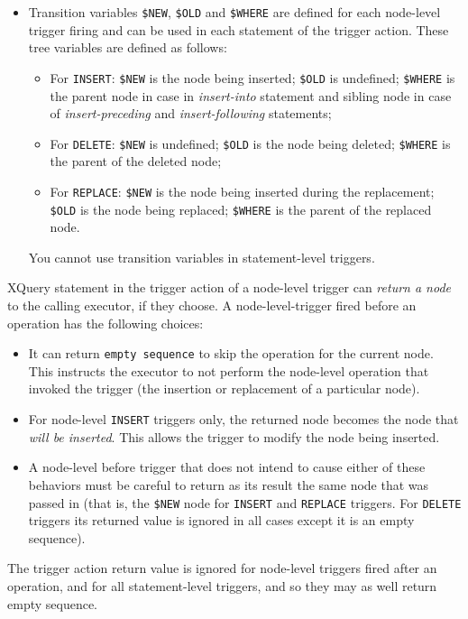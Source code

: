 \documentclass[a4paper,12pt]{article}
\newenvironment{citemize}
{\begin{itemize}
  \setlength{\itemsep}{0pt}
  \setlength{\parskip}{0pt}
  \setlength{\parsep}{0pt}}
{\end{itemize}}
\begin{document}
\begin{itemize}
\item Transition variables \verb!$NEW!, \verb!$OLD! and \verb!$WHERE! are
defined for each node-level trigger firing and can be used in each statement of
the trigger action. These tree variables are defined as follows:
\begin{citemize}
\item For \verb!INSERT!: \verb!$NEW! is the node being inserted; \verb!$OLD! is
undefined; \verb!$WHERE! is the parent node in case in \emph{insert-into}
statement and sibling node in case of \emph{insert-preceding} and
\emph{insert-following} statements;
\item For \verb!DELETE!: \verb!$NEW! is undefined; \verb!$OLD! is the node being
deleted; \verb!$WHERE! is the parent of the deleted node;
\item For \verb!REPLACE!: \verb!$NEW! is the node being inserted during the
replacement; \verb!$OLD! is the node being replaced; \verb!$WHERE! is the parent
of the replaced node.
\end{citemize}
You cannot use transition variables in statement-level triggers.
\end{itemize}

XQuery statement in the trigger action of a node-level trigger can \emph{return
a node} to the calling executor, if they choose. A node-level-trigger fired
before an operation has the following choices:

\begin{itemize}
\item It can return \verb!empty sequence! to skip the operation for the current
node. This instructs the executor to not perform the node-level operation that
invoked the trigger (the insertion or replacement of a particular node).
\item For node-level \verb!INSERT! triggers only, the returned node becomes the
node that \emph{will be inserted}. This allows the trigger to modify the node
being inserted.
\item A node-level before trigger that does not intend to cause either of these
behaviors must be careful to return as its result the same node that was passed
in (that is, the \verb!$NEW! node for \verb!INSERT! and \verb!REPLACE! triggers.
For \verb!DELETE! triggers its returned value is ignored in all cases except
it is an empty sequence).
\end{itemize}

The trigger action return value is ignored for node-level triggers fired after
an operation, and for all statement-level triggers, and so they may as well
return empty sequence.
\end{document}
